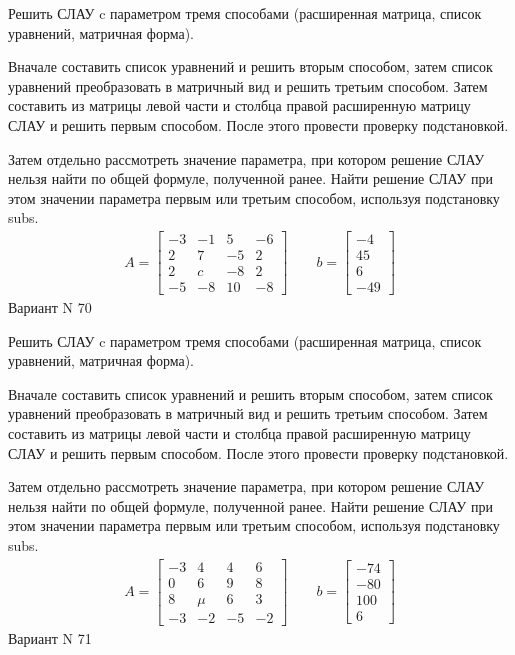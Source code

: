\documentclass[11pt]{report}
\begin{document}
Решить СЛАУ c параметром тремя способами (расширенная матрица, список уравнений, матричная форма).

Вначале составить список уравнений и решить вторым способом,
затем список уравнений преобразовать в матричный вид и решить третьим способом.
Затем составить из матрицы левой части и столбца правой расширенную матрицу СЛАУ и решить первым способом.
После этого провести проверку подстановкой.

Затем отдельно рассмотреть значение параметра, при котором решение СЛАУ нельзя найти по общей формуле,
полученной ранее.
Найти решение СЛАУ при этом значении параметра первым или третьим способом, используя подстановку subs.
\begin{align*}
    A = \left[\begin{matrix}-3 & -1 & 5 & -6\\2 & 7 & -5 & 2\\2 & c & -8 & 2\\-5 & -8 & 10 & -8\end{matrix}\right]
\qquad b = \left[\begin{matrix}-4\\45\\6\\-49\end{matrix}\right]
\end{align*}
\newpage
Вариант N 70


Решить СЛАУ c параметром тремя способами (расширенная матрица, список уравнений, матричная форма).

Вначале составить список уравнений и решить вторым способом,
затем список уравнений преобразовать в матричный вид и решить третьим способом.
Затем составить из матрицы левой части и столбца правой расширенную матрицу СЛАУ и решить первым способом.
После этого провести проверку подстановкой.

Затем отдельно рассмотреть значение параметра, при котором решение СЛАУ нельзя найти по общей формуле,
полученной ранее.
Найти решение СЛАУ при этом значении параметра первым или третьим способом, используя подстановку subs.
\begin{align*}
    A = \left[\begin{matrix}-3 & 4 & 4 & 6\\0 & 6 & 9 & 8\\8 & \mu & 6 & 3\\-3 & -2 & -5 & -2\end{matrix}\right]
\qquad b = \left[\begin{matrix}-74\\-80\\100\\6\end{matrix}\right]
\end{align*}
\newpage
Вариант N 71
\end{document}
